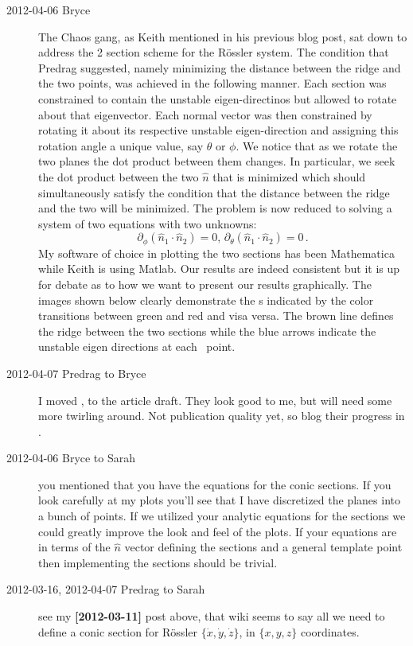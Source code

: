 \begin{description}
\item[2012-04-06 Bryce]  The Chaos gang, as Keith mentioned in his
previous blog post, sat down to address the 2 section scheme for the
R\"ossler system. The condition that Predrag suggested, namely
minimizing the distance between the ridge and the two {\eqv}
points, was achieved in the following manner. Each section was
constrained to contain the unstable eigen-directinos but allowed to
rotate about that eigenvector. Each normal vector was then constrained by
rotating it about its respective unstable eigen-direction and assigning
this rotation angle a unique value, say $\theta$ or $\phi$. We notice
that as we rotate the two planes the dot product between them changes. In
particular, we seek the dot product between the two $\hat{n}$ that is
minimized which should simultaneously satisfy the condition that the
distance between the ridge and the two {\eqv} will be minimized. The
problem is now reduced to solving a system of two equations with two
unknowns:
\[
\partial_{\phi}(\hat{n}_1\cdot\hat{n}_2)=0,\, \partial_{\theta}(\hat{n}_1\cdot\hat{n}_2)=0
\,.
\]
My software of choice in plotting the two sections has been Mathematica
while Keith is using Matlab. Our results are indeed consistent but it is
up for debate as to how we want to present our results graphically. The
images shown below clearly demonstrate the {\poincBord s}
indicated by the color transitions between green and red and visa versa.
The brown line defines the ridge between the two sections while the blue
arrows indicate the unstable eigen directions at each \eqv\ point.

\item[2012-04-07 Predrag to Bryce] I moved , to the
article draft. They look good to me, but will need some more twirling
around. Not publication quality yet, so blog their progress in
.

\item[2012-04-06 Bryce to Sarah]
you mentioned that you have the equations for the conic sections.
If you look carefully at my plots you'll see that I have discretized the
planes into a bunch of points. If we utilized  your analytic equations
for the sections we could greatly improve the look and feel of the plots.
If your equations are in terms of the $\hat{n}$ vector defining the
sections and a general template point then implementing the sections
should be trivial.

\item[2012-03-16, 2012-04-07 Predrag to Sarah] see my {\bf [2012-03-11]}
post above, that wiki seems to say all we need to define a conic section
for R\"ossler $\{\dot{x},\dot{y},\dot{z}\}$, in $\{x,y,z\}$ coordinates.


\end{description}
